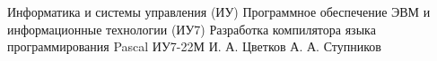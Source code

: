 \makecourseworktitle
{Информатика и системы управления (ИУ)}
{Программное обеспечение ЭВМ и информационные технологии (ИУ7)}
{Разработка компилятора языка программирования Pascal}
{ИУ7-22М}
{И. А. Цветков}
{А. А. Ступников}
{}
{}

